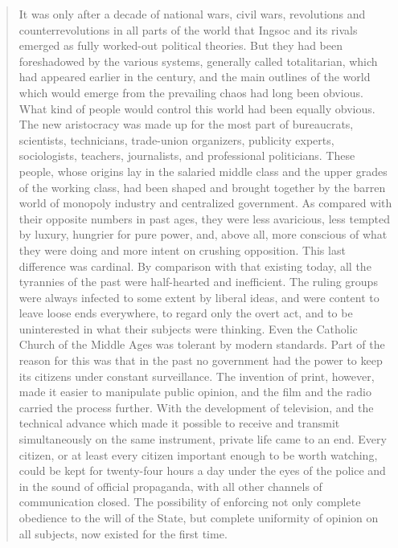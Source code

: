 \begin{quotation}
It was only after a decade of national wars, civil wars, revolutions and
counterrevolutions in all parts of the world that Ingsoc and its rivals
emerged as fully worked-out political theories. But they had been
foreshadowed by the various systems, generally called totalitarian,
which had appeared earlier in the century, and the main outlines of the
world which would emerge from the prevailing chaos had long been
obvious. What kind of people would control this world had been equally
obvious. The new aristocracy was made up for the most part of
bureaucrats, scientists, technicians, trade-union organizers, publicity
experts, sociologists, teachers, journalists, and professional
politicians. These people, whose origins lay in the salaried middle
class and the upper grades of the working class, had been shaped and
brought together by the barren world of monopoly industry and
centralized government. As compared with their opposite numbers in past
ages, they were less avaricious, less tempted by luxury, hungrier for
pure power, and, above all, more conscious of what they were doing and
more intent on crushing opposition. This last difference was cardinal.
By comparison with that existing today, all the tyrannies of the past
were half-hearted and inefficient. The ruling groups were always
infected to some extent by liberal ideas, and were content to leave
loose ends everywhere, to regard only the overt act, and to be
uninterested in what their subjects were thinking. Even the Catholic
Church of the Middle Ages was tolerant by modern standards. Part of the
reason for this was that in the past no government had the power to keep
its citizens under constant surveillance. The invention of print,
however, made it easier to manipulate public opinion, and the film and
the radio carried the process further. With the development of
television, and the technical advance which made it possible to receive
and transmit simultaneously on the same instrument, private life came to
an end. Every citizen, or at least every citizen important enough to be
worth watching, could be kept for twenty-four hours a day under the eyes
of the police and in the sound of official propaganda, with all other
channels of communication closed. The possibility of enforcing not only
complete obedience to the will of the State, but complete uniformity of
opinion on all subjects, now existed for the first time.


\end{quotation}
